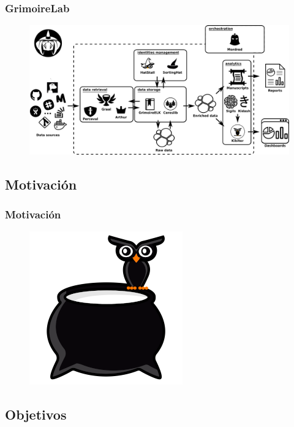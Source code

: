 \documentclass[
	11pt, %
	aspectratio=169, %
]{beamer}
\begin{document}

\begin{frame}
	\frametitle{GrimoireLab}

	\begin{figure}
		\includegraphics[width=0.8\linewidth]{grimoirelab-schema.png}
	\end{figure}
\end{frame}


\subsection[]{Motivación}

\begin{frame}
	\frametitle{Motivación}

	\begin{figure}
		\includegraphics[width=0.3\linewidth]{cauldron-logo.png}
	\end{figure}
\end{frame}


\subsection[]{Objetivos}
\end{document}
